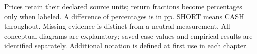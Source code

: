 Prices retain their declared source units; return fractions become
percentages only when labeled. A difference of percentages is in pp.
SHORT means CASH throughout. Missing evidence is distinct from a neutral
measurement. All conceptual diagrams are explanatory; saved-case values
and empirical results are identified separately. Additional notation is
defined at first use in each chapter.
